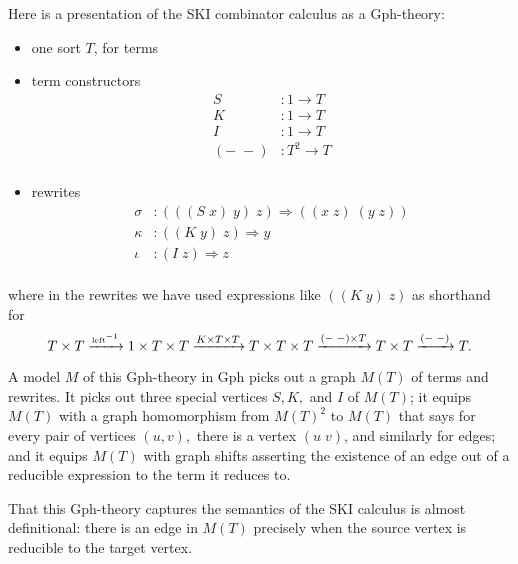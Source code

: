 \documentclass{llncs}
\begin{document}
Here is a presentation of the SKI combinator calculus as a Gph-theory:
\begin{itemize}
  \item one sort $T$, for terms
  \item term constructors
  \[\begin{array}{rl}
    S&:1 \to T\\
    K&:1 \to T\\
    I&:1 \to T\\
    (-\; -)&: T^2 \to T\\
  \end{array}\]
  \item rewrites
  \[\begin{array}{rl}
    \sigma&:(((S\; x)\; y)\; z) \Rightarrow ((x\; z)\; (y\; z))\\
    \kappa&:((K\; y)\; z) \Rightarrow y\\
    \iota&:(I\; z) \Rightarrow z\\
  \end{array}\]
\end{itemize}
where in the rewrites we have used expressions like $((K\; y)\; z)$ as shorthand for
\[ T\times T \xrightarrow{\tiny\mbox{left}^{-1}} 1\times T \times T \xrightarrow{K \times T \times T} T\times T \times T \xrightarrow{(-\;-)\times T} T\times T \xrightarrow{(-\;-)} T. \]

A model $M$ of this Gph-theory in Gph picks out a graph $M(T)$ of terms and rewrites.  It picks out three special vertices $S,K,$ and $I$ of $M(T)$; it equips $M(T)$ with a graph homomorphism from $M(T)^2$ to $M(T)$ that says for every pair of vertices $(u,v),$ there is a vertex $(u\;v)$, and similarly for edges; and it equips $M(T)$ with graph shifts asserting the existence of an edge out of a reducible expression to the term it reduces to.

That this Gph-theory captures the semantics of the SKI calculus is almost definitional: there is an edge in $M(T)$ precisely when the source vertex is reducible to the target vertex.  
\end{document}
